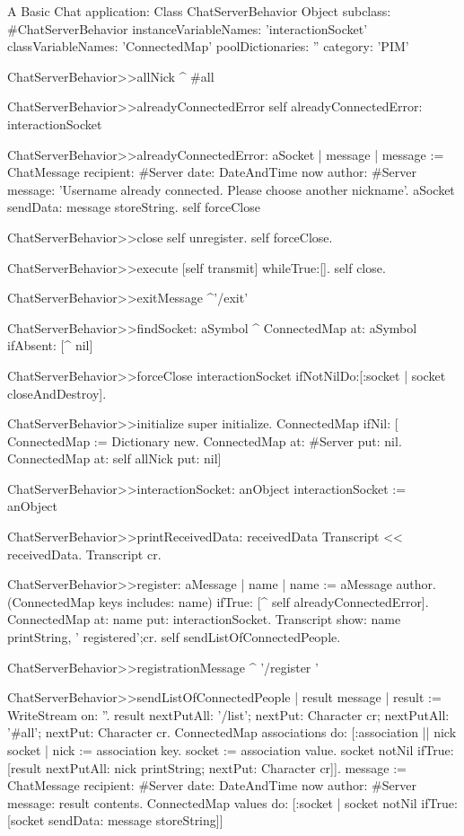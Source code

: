 \documentclass[a4paper,10pt,twoside]{book}
\begin{document}
\begin{script}{A Basic Chat application: Class ChatServerBehavior}
Object subclass: #ChatServerBehavior
	instanceVariableNames: 'interactionSocket'
	classVariableNames: 'ConnectedMap'
	poolDictionaries: ''
	category: 'PIM'


ChatServerBehavior>>allNick
	^ #all

ChatServerBehavior>>alreadyConnectedError
	self alreadyConnectedError: interactionSocket

ChatServerBehavior>>alreadyConnectedError: aSocket
	| message |
	message := ChatMessage
					recipient: #Server
					date: DateAndTime now
					author: #Server
					message: 'Username already connected. Please choose another nickname'.					
	aSocket sendData: message storeString.
	self forceClose

ChatServerBehavior>>close
	self unregister.
	self forceClose.

ChatServerBehavior>>execute
	[self transmit] whileTrue:[].
	self close.

ChatServerBehavior>>exitMessage
	^'/exit'

ChatServerBehavior>>findSocket: aSymbol
	^ ConnectedMap at: aSymbol ifAbsent: [^ nil]

ChatServerBehavior>>forceClose
	interactionSocket ifNotNilDo:[:socket | socket closeAndDestroy].

ChatServerBehavior>>initialize
	super initialize.
	ConnectedMap 
		ifNil: [
			ConnectedMap := Dictionary new.
			ConnectedMap at: #Server put: nil.
			ConnectedMap at: self allNick put: nil]

ChatServerBehavior>>interactionSocket: anObject
	interactionSocket := anObject

ChatServerBehavior>>printReceivedData: receivedData
	Transcript << receivedData.
	Transcript cr.

ChatServerBehavior>>register: aMessage
	| name |
	name := aMessage author.
	(ConnectedMap keys includes: name)
		ifTrue: [^ self alreadyConnectedError].
	ConnectedMap at: name put: interactionSocket.
	Transcript show: name printString, ' registered';cr.
	self sendListOfConnectedPeople.

ChatServerBehavior>>registrationMessage
	^ '/register '

ChatServerBehavior>>sendListOfConnectedPeople
	| result message |
	result := WriteStream on: ''.
	result 
		nextPutAll: '/list';
		nextPut: Character cr;
		nextPutAll: '#all';
		nextPut: Character cr.
	ConnectedMap associations do: [:association || nick socket |
		nick := association key.
		socket := association value.
		socket notNil
			ifTrue: [result 
						nextPutAll: nick printString;
						nextPut: Character cr]].
	message := ChatMessage
					recipient: #Server
					date: DateAndTime now
					author: #Server
					message: result contents.
	ConnectedMap values do: [:socket |
		socket notNil
			ifTrue: [socket sendData: message storeString]]



\end{script}
\end{document}
